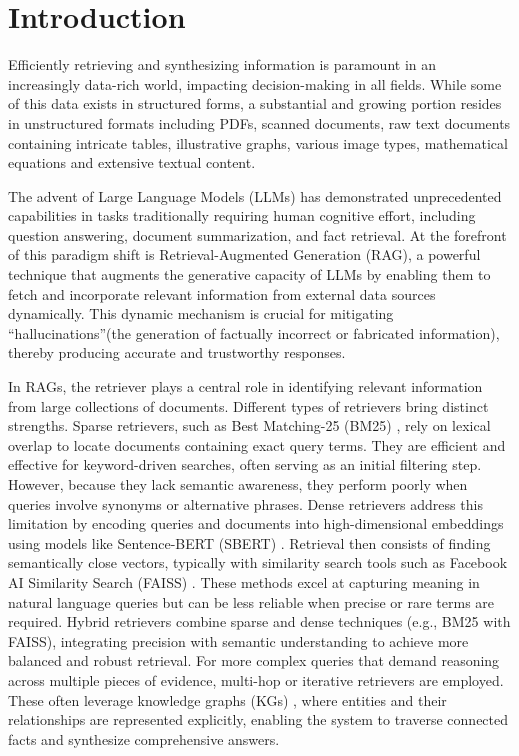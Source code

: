 \documentclass{svproc}
\begin{document}
\section{Introduction}
Efficiently retrieving and synthesizing information is paramount in an increasingly data-rich world, impacting decision-making in all fields. While some of this data exists in structured forms, a substantial and growing portion resides in unstructured formats \cite{UDA} including PDFs, scanned documents, raw text documents containing intricate tables, illustrative graphs, various image types, mathematical equations and extensive textual content.

The advent of Large Language Models (LLMs) has demonstrated unprecedented capabilities in tasks traditionally requiring human cognitive effort, including question answering, document summarization, and fact retrieval. At the forefront of this paradigm shift is Retrieval-Augmented Generation (RAG), a powerful technique that augments the generative capacity of LLMs by enabling them to fetch and incorporate relevant information from external data sources dynamically. This dynamic mechanism is crucial for mitigating \textquotedblleft hallucinations\textquotedblright (the generation of factually incorrect or fabricated information), thereby producing accurate and trustworthy responses.


In RAGs, the retriever plays a central role in identifying relevant information from large collections of documents. Different types of retrievers bring distinct strengths. Sparse retrievers, such as Best Matching-25 (BM25) \cite{10.1007/978-1-4471-2099-5_24}, rely on lexical overlap to locate documents containing exact query terms. They are efficient and effective for keyword-driven searches, often serving as an initial filtering step. However, because they lack semantic awareness, they perform poorly when queries involve synonyms or alternative phrases. Dense retrievers address this limitation by encoding queries and documents into high-dimensional embeddings using models like Sentence-BERT (SBERT)  \cite{sbert}. Retrieval then consists of finding semantically close vectors, typically with similarity search tools such as Facebook AI Similarity Search (FAISS) \cite{douze2025faisslibrary}. These methods excel at capturing meaning in natural language queries but can be less reliable when precise or rare terms are required. Hybrid retrievers combine sparse and dense techniques (e.g., BM25 with FAISS), integrating precision with semantic understanding to achieve more balanced and robust retrieval. For more complex queries that demand reasoning across multiple pieces of evidence, multi-hop or iterative retrievers are employed. These often leverage knowledge graphs (KGs) \cite{KG_IRAG}, where entities and their relationships are represented explicitly, enabling the system to traverse connected facts and synthesize comprehensive answers.
\end{document}
